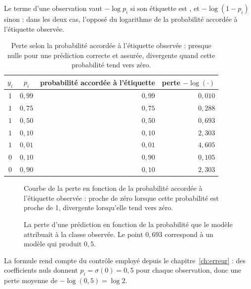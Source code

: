 Le terme d'une observation vaut $-\log p_i$ si son étiquette est \Gryf, et
$-\log(1-p_i)$ sinon : dans les deux cas, l'opposé du logarithme de la
probabilité accordée à l'étiquette observée.

\begin{table}[htbp]
\centering
\begin{tabular}{ccrr}
\toprule
$y_i$ & $p_i$ & probabilité accordée à l'étiquette & perte $-\log(\cdot)$ \\
\midrule
$1$ & $0{,}99$ & $0{,}99$ & $0{,}010$ \\
$1$ & $0{,}75$ & $0{,}75$ & $0{,}288$ \\
$1$ & $0{,}50$ & $0{,}50$ & $0{,}693$ \\
$1$ & $0{,}10$ & $0{,}10$ & $2{,}303$ \\
$1$ & $0{,}01$ & $0{,}01$ & $4{,}605$ \\
\midrule
$0$ & $0{,}10$ & $0{,}90$ & $0{,}105$ \\
$0$ & $0{,}90$ & $0{,}10$ & $2{,}303$ \\
\bottomrule
\end{tabular}
\caption{Perte selon la probabilité accordée à l'étiquette observée : presque nulle pour
une prédiction correcte et assurée, divergente quand cette probabilité tend vers
zéro.}
\label{tab:cout-individuel}
\end{table}

\begin{figure}[htbp]
\centering
\begin{graphique}{Courbe de la perte en fonction de la probabilité accordée à l'étiquette observée : proche de zéro lorsque cette probabilité est proche de 1, divergente lorsqu'elle tend vers zéro.}
\end{graphique}
\caption{La perte d'une prédiction en fonction de la probabilité que le modèle
attribuait à la classe observée. Le point $0{,}693$ correspond à un modèle qui
produit $0{,}5$.}
\label{fig:cout-individuel}
\end{figure}
\FloatBarrier

La formule rend compte du contrôle employé depuis le chapitre~\ref{ch:erreur} :
des coefficients nuls donnent $p_i=\sigma(0)=0{,}5$ pour chaque observation, donc
une perte moyenne de $-\log(0{,}5)=\log 2$.
